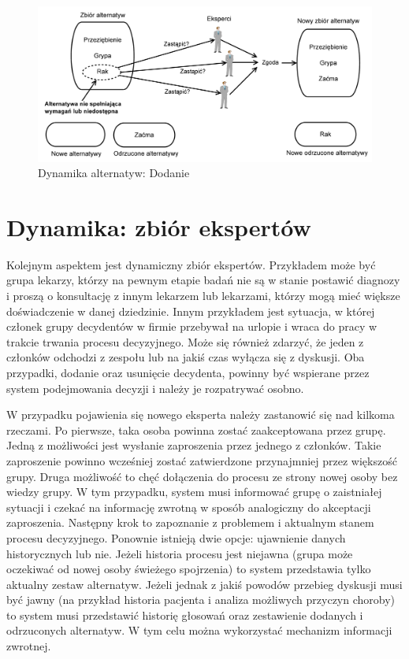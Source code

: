 \begin{figure}[ht]
  \includegraphics[width=\linewidth]
  	{chapters/modelinggroupdecision/usuniecie_alternatyw-eps-converted-to.pdf}
  \caption{Dynamika alternatyw: Dodanie}
  \label{fig:dynamika_alternatyw_dodanie}
\end{figure}

\section{Dynamika: zbiór ekspertów}
Kolejnym aspektem jest dynamiczny zbiór ekspertów. Przykładem może być grupa
lekarzy, którzy na pewnym etapie badań nie są w stanie postawić diagnozy i
proszą o konsultację z innym lekarzem lub lekarzami, którzy mogą mieć większe
doświadczenie w danej dziedzinie. Innym przykładem jest sytuacja, w której
członek grupy decydentów w firmie przebywał na urlopie i wraca do pracy w
trakcie trwania procesu decyzyjnego. Może się również zdarzyć, że jeden z
członków odchodzi z zespołu lub na jakiś czas wyłącza się z dyskusji. Oba
przypadki, dodanie oraz usunięcie decydenta, powinny być wspierane przez system
podejmowania decyzji i należy je rozpatrywać osobno. 

W przypadku pojawienia się nowego eksperta należy zastanowić się nad kilkoma
rzeczami. Po pierwsze, taka osoba powinna zostać zaakceptowana przez grupę.
Jedną z możliwości jest wysłanie zaproszenia przez jednego z członków. Takie
zaproszenie powinno wcześniej zostać zatwierdzone przynajmniej przez większość
grupy. Druga możliwość to chęć dołączenia do procesu ze strony nowej osoby bez
wiedzy grupy. W tym przypadku, system musi informować grupę o zaistniałej
sytuacji i czekać na informację zwrotną w sposób analogiczny do akceptacji
zaproszenia. Następny krok to zapoznanie z problemem i aktualnym stanem procesu
decyzyjnego. Ponownie istnieją dwie opcje: ujawnienie danych historycznych lub
nie. Jeżeli historia procesu jest niejawna (grupa może oczekiwać od nowej osoby
świeżego spojrzenia) to system przedstawia tylko aktualny zestaw alternatyw.
Jeżeli jednak z jakiś powodów przebieg dyskusji musi być jawny (na przykład
historia pacjenta i analiza możliwych przyczyn choroby) to system musi
przedstawić historię głosowań oraz zestawienie dodanych i odrzuconych
alternatyw. W tym celu można wykorzystać mechanizm informacji zwrotnej.

